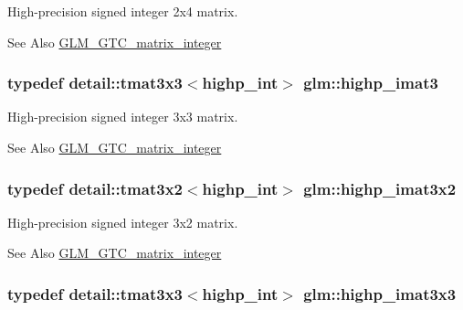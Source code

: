 High-\/precision signed integer 2x4 matrix. 

\begin{DoxySeeAlso}{See Also}
\hyperlink{group__gtc__matrix__integer}{G\-L\-M\-\_\-\-G\-T\-C\-\_\-matrix\-\_\-integer} 
\end{DoxySeeAlso}
\hypertarget{group__gtc__matrix__integer_gab7c4db50bdedef67e45ce7d4ae68e567}{
\subsubsection[{highp\-\_\-imat3}]{\setlength{\rightskip}{0pt plus 5cm}typedef detail\-::tmat3x3$<$highp\-\_\-int$>$ {\bf glm\-::highp\-\_\-imat3}}}\label{group__gtc__matrix__integer_gab7c4db50bdedef67e45ce7d4ae68e567}


High-\/precision signed integer 3x3 matrix. 

\begin{DoxySeeAlso}{See Also}
\hyperlink{group__gtc__matrix__integer}{G\-L\-M\-\_\-\-G\-T\-C\-\_\-matrix\-\_\-integer} 
\end{DoxySeeAlso}
\hypertarget{group__gtc__matrix__integer_gab33e4ccf70f2e1f2eae7c6ddfb594e3c}{
\subsubsection[{highp\-\_\-imat3x2}]{\setlength{\rightskip}{0pt plus 5cm}typedef detail\-::tmat3x2$<$highp\-\_\-int$>$ {\bf glm\-::highp\-\_\-imat3x2}}}\label{group__gtc__matrix__integer_gab33e4ccf70f2e1f2eae7c6ddfb594e3c}


High-\/precision signed integer 3x2 matrix. 

\begin{DoxySeeAlso}{See Also}
\hyperlink{group__gtc__matrix__integer}{G\-L\-M\-\_\-\-G\-T\-C\-\_\-matrix\-\_\-integer} 
\end{DoxySeeAlso}
\hypertarget{group__gtc__matrix__integer_gaf44e40dda4b36c90b4a9210e7b936c93}{
\subsubsection[{highp\-\_\-imat3x3}]{\setlength{\rightskip}{0pt plus 5cm}typedef detail\-::tmat3x3$<$highp\-\_\-int$>$ {\bf glm\-::highp\-\_\-imat3x3}}}\label{group__gtc__matrix__integer_gaf44e40dda4b36c90b4a9210e7b936c93}


